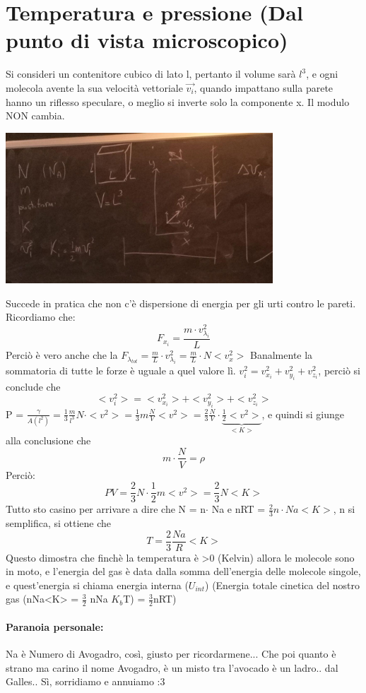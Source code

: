 \documentclass[12pt, a4paper, openany, oneside]{book}
\begin{document}
\section{Temperatura e pressione (Dal punto di vista microscopico)}
Si consideri un contenitore cubico di lato l, pertanto il volume sarà $l^{3}$, e
ogni molecola avente la sua velocità vettoriale $\overrightarrow{v_{i}}$, quando
impattano sulla parete hanno un riflesso speculare, o meglio si inverte solo la
componente x. Il modulo NON cambia.
\begin{center}
\includegraphics[width=0.75\textwidth]{16}
\end{center}   
Succede in pratica che non c'è dispersione di energia per gli urti contro le pareti.
Ricordiamo che:
\[
F_{x_{i}} = \frac{m\cdot v^{2}_{\lambda_{i}}}{L}
\]	
Perciò è vero anche che la $F_{\lambda_{tot}} = \frac{m}{L} \cdot v^{2}_{\lambda_{i}} =
\frac{m}{L} \cdot N <v_{x}^{2}>$
Banalmente la sommatoria di tutte le forze è uguale a quel valore lì.
$v_{i}^{2} = v_{x_{i}}^{2} + v_{y_{i}}^{2} + v_{z_{i}}^{2}$, perciò si conclude
che \[
<v_{i}^{2}> = <v_{x_{i}}^{2}> + <v_{y_{i}}^{2}> + <v_{z_{i}}^{2}>
\]
P = $\frac{\gamma}{A (l^{2})} = \frac{1}{3} \frac{m}{l^{3}} N \cdot <v^{2}> =
\frac{1}{3}m \frac{N}{V} <v^{2}> = \frac{2}{3} \frac{N}{V} \cdot 
\underbrace{\frac{1}{2} <v^{2}>}_{<K>}$, e quindi si giunge alla conclusione
che 
\[
m \cdot \frac{N}{V} = \rho
\]
Perciò:
\[
PV = \frac{2}{3}N \cdot \frac{1}{2}m <v^{2}> = \frac{2}{3}N <K>
\]	
Tutto sto casino per arrivare a dire che N = n$\cdot$ Na e 
nRT = $\frac{2}{3} n\cdot Na <K>$, n si semplifica, si ottiene che
\[
T = \frac{2}{3} \frac{Na}{R} <K>
\]	
Questo dimostra che finchè la temperatura è >0 (Kelvin) allora le molecole sono
in moto, e l'energia del gas è data dalla somma dell'energia delle molecole 
singole, e quest'energia si chiama energia interna ($U_{int}$) (Energia totale
cinetica del nostro gas (nNa<K> = $\frac{3}{2}$ nNa $K_{b}$T) = $\frac{3}{2}$nRT) 
\paragraph{Paranoia personale: }Na è Numero di Avogadro, così, giusto per 
ricordarmene... Che poi quanto è strano ma carino il nome Avogadro, è un misto
tra l'avocado è un ladro.. dal Galles.. Sì, sorridiamo e annuiamo :3
\end{document}
